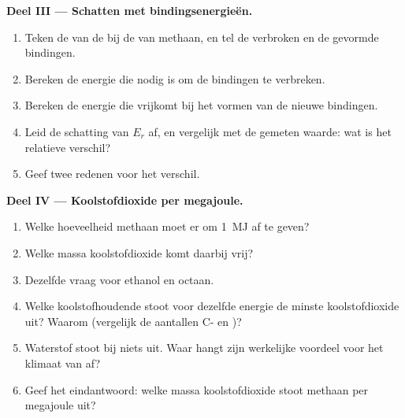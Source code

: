 \begin{problem}
\medskip
\noindent\textbf{Deel III --- Schatten met bindingsenergieën.}
\begin{enumerate}[resume]
  \item Teken de  van de  bij de  van
        methaan, en tel de verbroken en de gevormde bindingen.
  \item Bereken de energie die nodig is om de bindingen te verbreken.
  \item Bereken de energie die vrijkomt bij het vormen van de nieuwe
        bindingen.
  \item Leid de schatting van $E_r$ af, en vergelijk met de gemeten
        waarde: wat is het relatieve verschil?
  \item Geef twee redenen voor het verschil.
\end{enumerate}

\medskip
\noindent\textbf{Deel IV --- Koolstofdioxide per megajoule.}
\begin{enumerate}[resume]
  \item Welke hoeveelheid methaan moet er  om \qty{1}{MJ} af te
        geven?
  \item Welke massa koolstofdioxide komt daarbij vrij?
  \item Dezelfde vraag voor ethanol en octaan.
  \item Welke koolstofhoudende  stoot voor dezelfde energie de
        minste koolstofdioxide uit? Waarom (vergelijk de aantallen C- en
        )?
  \item Waterstof stoot bij  niets uit. Waar hangt zijn
        werkelijke voordeel voor het klimaat van af?
  \item Geef het eindantwoord: welke massa koolstofdioxide stoot methaan
        per megajoule uit?
\end{enumerate}
\end{problem}
